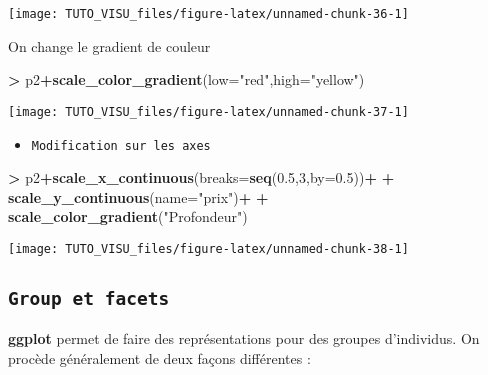 \documentclass[]{book}
\newenvironment{Shaded}{\begin{snugshade}}{\end{snugshade}}
\newcommand{\DataTypeTok}[1]{\textcolor[rgb]{0.13,0.29,0.53}{#1}}
\newcommand{\DecValTok}[1]{\textcolor[rgb]{0.00,0.00,0.81}{#1}}
\newcommand{\FloatTok}[1]{\textcolor[rgb]{0.00,0.00,0.81}{#1}}
\newcommand{\KeywordTok}[1]{\textcolor[rgb]{0.13,0.29,0.53}{\textbf{#1}}}
\newcommand{\NormalTok}[1]{#1}
\newcommand{\OperatorTok}[1]{\textcolor[rgb]{0.81,0.36,0.00}{\textbf{#1}}}
\newcommand{\StringTok}[1]{\textcolor[rgb]{0.31,0.60,0.02}{#1}}
\providecommand{\tightlist}{%
  \setlength{\itemsep}{0pt}\setlength{\parskip}{0pt}}
\theoremstyle{definition}
\theoremstyle{definition}
\theoremstyle{definition}
\theoremstyle{remark}
\begin{document}
\begin{center}\texttt{[image: TUTO\_VISU\_files/figure-latex/unnamed-chunk-36-1]} \end{center}

On change le gradient de couleur

\begin{Shaded}
\begin{Highlighting}[]
\OperatorTok{>}\StringTok{ }\NormalTok{p2}\OperatorTok{+}\KeywordTok{scale_color_gradient}\NormalTok{(}\DataTypeTok{low=}\StringTok{"red"}\NormalTok{,}\DataTypeTok{high=}\StringTok{"yellow"}\NormalTok{)}
\end{Highlighting}
\end{Shaded}

\begin{center}\texttt{[image: TUTO\_VISU\_files/figure-latex/unnamed-chunk-37-1]} \end{center}

\begin{itemize}
\tightlist
\item
  \texttt{Modification\ sur\ les\ axes}
\end{itemize}

\begin{Shaded}
\begin{Highlighting}[]
\OperatorTok{>}\StringTok{ }\NormalTok{p2}\OperatorTok{+}\KeywordTok{scale_x_continuous}\NormalTok{(}\DataTypeTok{breaks=}\KeywordTok{seq}\NormalTok{(}\FloatTok{0.5}\NormalTok{,}\DecValTok{3}\NormalTok{,}\DataTypeTok{by=}\FloatTok{0.5}\NormalTok{))}\OperatorTok{+}
\OperatorTok{+}\StringTok{   }\KeywordTok{scale_y_continuous}\NormalTok{(}\DataTypeTok{name=}\StringTok{"prix"}\NormalTok{)}\OperatorTok{+}
\OperatorTok{+}\StringTok{   }\KeywordTok{scale_color_gradient}\NormalTok{(}\StringTok{"Profondeur"}\NormalTok{)}
\end{Highlighting}
\end{Shaded}

\begin{center}\texttt{[image: TUTO\_VISU\_files/figure-latex/unnamed-chunk-38-1]} \end{center}

\hypertarget{group-et-facets}{%
\subsection{\texorpdfstring{\texttt{Group\ et\ facets}}{Group et facets}}\label{group-et-facets}}

\textbf{ggplot} permet de faire des représentations pour des groupes d'individus. On procède généralement de deux façons différentes :
\end{document}
